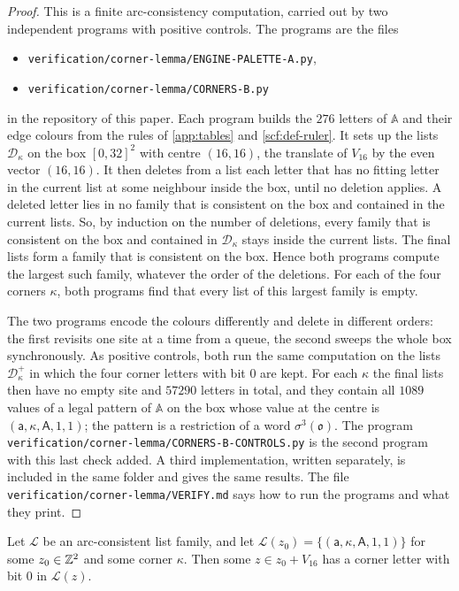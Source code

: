 \begin{proof}
This is a finite arc-consistency computation, carried out by two independent programs with positive controls. The programs are the files
\begin{itemize}
\item \texttt{verification/corner-lemma/ENGINE-PALETTE-A.py},
\item \texttt{verification/corner-lemma/CORNERS-B.py}
\end{itemize}
in the repository of this paper. Each program builds the $276$ letters of $\mathbb A$ and their edge colours from the rules of \cref{app:tables} and \cref{scf:def-ruler}. It sets up the lists $\mathcal D_\kappa$ on the box $[0,32]^2$ with centre $(16,16)$, the translate of $V_{16}$ by the even vector $(16,16)$. It then deletes from a list each letter that has no fitting letter in the current list at some neighbour inside the box, until no deletion applies. A deleted letter lies in no family that is consistent on the box and contained in the current lists. So, by induction on the number of deletions, every family that is consistent on the box and contained in $\mathcal D_\kappa$ stays inside the current lists. The final lists form a family that is consistent on the box. Hence both programs compute the largest such family, whatever the order of the deletions. For each of the four corners $\kappa$, both programs find that every list of this largest family is empty.

The two programs encode the colours differently and delete in different orders: the first revisits one site at a time from a queue, the second sweeps the whole box synchronously. As positive controls, both run the same computation on the lists $\mathcal D^+_\kappa$ in which the four corner letters with bit $0$ are kept. For each $\kappa$ the final lists then have no empty site and $57290$ letters in total, and they contain all $1089$ values of a legal pattern of $\mathbb A$ on the box whose value at the centre is $(\mathsf a,\kappa,\mathsf A,1,1)$; the pattern is a restriction of a word $\sigma^3(\mathfrak o)$. The program \texttt{verification/corner-lemma/CORNERS-B-CONTROLS.py} is the second program with this last check added. A third implementation, written separately, is included in the same folder and gives the same results. The file \texttt{verification/corner-lemma/VERIFY.md} says how to run the programs and what they print.
\end{proof}

\begin{corollary}\label{thr:corner-plane}
Let $\mathcal L$ be an arc-consistent list family, and let $\mathcal L(z_0)=\{(\mathsf a,\kappa,\mathsf A,1,1)\}$ for some $z_0\in\mathbb{Z}^2$ and some corner $\kappa$. Then some $z\in z_0+V_{16}$ has a corner letter with bit $0$ in $\mathcal L(z)$.
\end{corollary}

